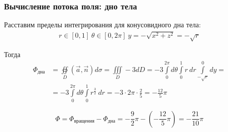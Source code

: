 \begin{frame}\frametitle{Вычисление потока поля: дно тела}

	Расставим пределы интегрирования для конусовидного дна тела:
	\begin{align*}
		r \in [0,1] \
		\theta \in [0, 2\pi] \
		y = -\sqrt{x^2 + z^2} = -\sqrt{r}
	\end{align*}

	Тогда
	\begin{align*}
		\Phi_{\text{дна}}
    &=  \oiint\limits_{D}\left( \vec {a}, \vec {n} \right) d\sigma = \iiint\limits_D -3 dD
		= -3 \int\limits_{0}^{2 \pi} d \theta
		\int\limits_{0}^{1} r~dr
		\int\limits_{-\sqrt{r}}^{0} dy = \\
    &= -3 \int\limits_{0}^{2 \pi} d \theta
		\int\limits_{0}^{1}r^{\frac{3}{2}}~dr
    = -3 \cdot 2 \pi \cdot \frac{2}{5} = - \frac{12}{5} \pi
	\end{align*}

	\begin{equation*}
		\Phi =
    \Phi_{\text{вращения}} - \Phi_{\text{дна}} =
    -\frac{9}{2}\pi - \left(- \frac{12}{5} \pi\right) = - \frac{21}{10} \pi
	\end{equation*}
\end{frame}
